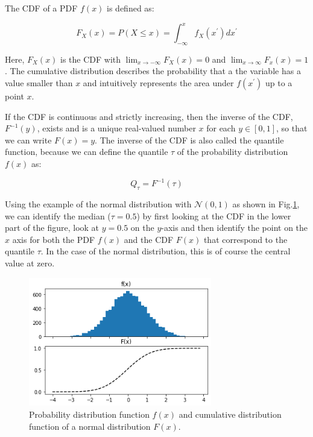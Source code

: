 \documentclass[BCOR=1mm, DIV=calc,10pt,
twoside=true,
twocolumn,
headings=normal]{scrartcl}
\newcommand{\fig}{Fig.}
\begin{document}
\noindent
The CDF of a PDF $f(x)$ is defined as:

\begin{equation}
\label{eqn:CDF}
F_X(x) = P(X \le x) = \int_{-\infty}^{x} f_X(x^\prime) dx^\prime
\end{equation}

Here, $F_X(x)$ is the CDF with $\lim_{x \to -\infty}F_X(x) = 0$ and $\lim_{x \to \infty}F_x(x) = 1$. The cumulative distribution describes the probability that a the variable has a value smaller than $x$ and intuitively represents the area under $f(x^\prime)$ up to a point $x$.

If the CDF is continuous and strictly increasing, then the inverse of the CDF, $F^{-1}(y)$, exists and is a unique real-valued number $x$ for each $y \in [0,1]$, so that we can write $F(x) = y$. The inverse of the CDF is also called the quantile function, because we can define the quantile $\tau$ of the probability distribution $f(x)$ as:

\begin{equation}
Q_\tau = F^{-1}(\tau)
\end{equation}

Using the example of the normal distribution with $\mathcal{N}(0,1)$ as shown in \fig \ref{fig:PdfCdf}, we can identify the median ($\tau = 0.5$) by first looking at the CDF in the lower part of the figure, look at $y=0.5$ on the $y$-axis and then identify the point on the $x$ axis for both the PDF $f(x)$ and the CDF $F(x)$ that correspond to the quantile $\tau$. In the case of the normal distribution, this is of course the central value at zero.

\begin{figure}
\begin{center}
\includegraphics[width=8cm]{../figures/PdfCdf}
\caption{\label{fig:PdfCdf} Probability distribution function $f(x)$ and cumulative distribution function of a normal distribution $F(x)$.}
\end{center}
\end{figure}
\end{document}
